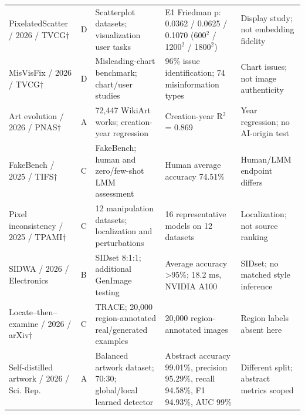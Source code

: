 \begin{table}[tb]
\begin{tabularx}{\textwidth}
{}\cite{p9} PixelatedScatter / 2026 / TVCG$\dagger$ & D & Scatterplot datasets; visualization user tasks & E1 Friedman p: 0.0362 / 0.0625 / 0.1070 (600$^2$ / 1200$^2$ / 1800$^2$) & Display study; not embedding fidelity\\
{}\cite{p10} MisVisFix / 2026 / TVCG$\dagger$ & D & Misleading-chart benchmark; chart/user studies & 96\% issue identification; 74 misinformation types & Chart issues; not image authenticity\\
{}\cite{p11} Art evolution / 2026 / PNAS$\dagger$ & A & 72,447 WikiArt works; creation-year regression & Creation-year R$^2$ = 0.869 & Year regression; no AI-origin test\\
{}\cite{p12} FakeBench / 2025 / TIFS$\dagger$ & C & FakeBench; human and zero/few-shot LMM assessment & Human average accuracy 74.51\% & Human/LMM endpoint differs\\
{}\cite{p13} Pixel inconsistency / 2025 / TPAMI$\dagger$ & C & 12 manipulation datasets; localization and perturbations & 16 representative models on 12 datasets & Localization; not source ranking\\
{}\cite{p14} SIDWA / 2026 / Electronics & B & SIDset 8:1:1; additional GenImage testing & Average accuracy >95\%; 18.2 ms, NVIDIA A100 & SIDset; no matched style inference\\
{}\cite{p15} Locate--then--examine / 2026 / arXiv$\dagger$ & C & TRACE; 20,000 region-annotated real/generated examples & 20,000 region-annotated images & Region labels absent here\\
{}\cite{p16} Self-distilled artwork / 2026 / Sci. Rep. & A & Balanced artwork dataset; 70:30; global/local learned detector & Abstract accuracy 99.01\%, precision 95.29\%, recall 94.58\%, F1 94.93\%, AUC 99\% & Different split; abstract metrics scoped\\
\bottomrule\end{tabularx}
\end{table}